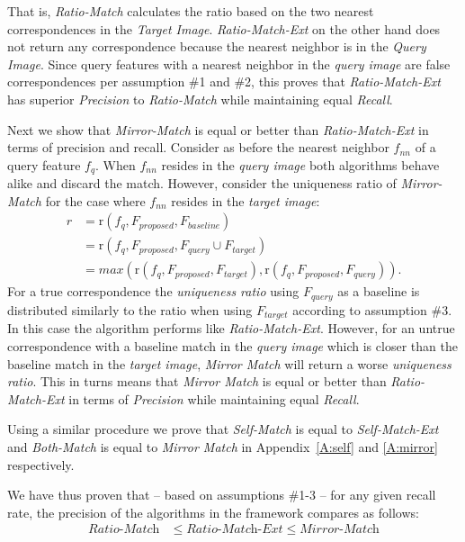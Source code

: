 \documentclass[10pt,journal,cspaper,compsoc]{IEEEtran}
\begin{document}
That is, \emph{Ratio-Match} calculates the ratio based on the two 
nearest correspondences in the \emph{Target Image}. 
\emph{Ratio-Match-Ext} on the other hand does not return any 
correspondence because the nearest neighbor is in the \emph{Query 
Image}. Since query features with a nearest neighbor in the \emph{query 
image} are false correspondences per assumption \#1 and \#2, this proves 
that \emph{Ratio-Match-Ext} has superior \emph{Precision} to 
\emph{Ratio-Match} while maintaining equal \emph{Recall}.

Next we show that \emph{Mirror-Match} is equal or better than 
\emph{Ratio-Match-Ext} in terms of precision and recall. Consider as 
before the nearest neighbor $f_{nn}$ of a query feature $f_{q}$. When 
$f_{nn}$ resides in the \emph{query image} both algorithms behave alike 
and discard the match.  However, consider the uniqueness ratio of 
\emph{Mirror-Match} for the case where $f_{nn}$ resides in the 
\emph{target image}:
\begin{align*}
    r &= \text{r}(f_{q}, F_{proposed}, F_{baseline}) \\
        &= \text{r}(f_{q}, F_{proposed}, F_{query} \cup F_{target})\\
        &= max( \text{r}(f_{q}, F_{proposed}, F_{target}), 
    \text{r}(f_{q}, F_{proposed}, F_{query}) ).
\end{align*}
For a true correspondence the \emph{uniqueness ratio} using 
$F_{query}$ as a baseline is distributed similarly to the ratio when using 
$F_{target}$ according to assumption \#3. In this case the algorithm performs like 
\emph{Ratio-Match-Ext}.  However, for an untrue correspondence with a 
baseline match in the \emph{query image} which is closer than the
baseline match in the \emph{target image}, \emph{Mirror Match} will 
return a worse \emph{uniqueness ratio}. This in turns means that \emph{Mirror 
Match} is equal or better than \emph{Ratio-Match-Ext} in terms of  
\emph{Precision} while maintaining equal \emph{Recall}.

Using a similar procedure we prove that \emph{Self-Match} is equal to
\emph{Self-Match-Ext} and \emph{Both-Match} is equal to \emph{Mirror
Match} in Appendix~\ref{A:self} and \ref{A:mirror} respectively.


We have thus proven that -- based on assumptions \#1-3 -- for any given recall rate, the precision of the algorithms in the framework compares as follows:
\begin{align*}
    \textit{Ratio-Match} &\leq \textit{Ratio-Match-Ext} \leq 
    \textit{Mirror-Match}
\end{align*}
\end{document}
